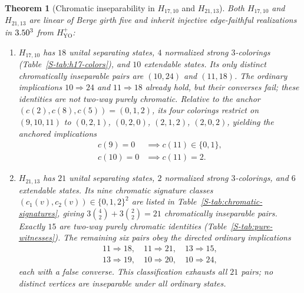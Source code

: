 \documentclass[aps,pra,reprint,superscriptaddress,longbibliography,nofootinbib,floatfix,10pt]{revtex4-2}
\newtheorem{theorem}{Theorem}
\theoremstyle{definition}\newtheorem{definition}[theorem]{Definition}
\theoremstyle{remark}\newtheorem{remark}[theorem]{Remark}
\newcommand{\YO}{\mathrm{YO}}\newcommand{\ip}[2]{\langle #1,#2\rangle}
\begin{document}
\begin{theorem}[Chromatic inseparability in $H_{17,10}$ and $H_{21,13}$]\label{thm:h17}\label{thm:h21}
Both $H_{17,10}$ and $H_{21,13}$ are linear of Berge girth five and inherit injective edge-faithful realizations in $3.50^3$ from $H_{\YO}^{+}$:
\begin{enumerate}
\item $H_{17,10}$ has $18$ unital separating states, $4$ normalized strong $3$-colorings (Table~\ref{S-tab:h17-colors}), and $10$ extendable states. Its only distinct chromatically inseparable pairs are $(10,24)$ and $(11,18)$. The ordinary implications $10\Rightarrow24$ and $11\Rightarrow18$ already hold, but their converses fail; these identities are not two-way purely chromatic. Relative to the anchor $(c(2),c(8),c(5))=(0,1,2)$, its four colorings restrict on $(9,10,11)$ to $(0,2,1)$, $(0,2,0)$, $(2,1,2)$, $(2,0,2)$, yielding the anchored implications
\begin{equation}\label{eq:anchored}
\begin{aligned}
c(9)=0&\implies c(11)\in\{0,1\},\\
c(10)=0&\implies c(11)=2.
\end{aligned}
\end{equation}
\item $H_{21,13}$ has $21$ unital separating states, $2$ normalized strong $3$-colorings, and $6$ extendable states. Its nine chromatic signature classes $(c_1(v),c_2(v))\in\{0,1,2\}^2$ are listed in Table~\ref{S-tab:chromatic-signatures}, giving $3\binom{4}{2}+3\binom{2}{2}=21$ chromatically inseparable pairs. Exactly $15$ are two-way purely chromatic identities (Table~\ref{S-tab:pure-witnesses}). The remaining six pairs obey the directed ordinary implications
\[
\begin{gathered}
11\Rightarrow18,\quad11\Rightarrow21,\quad
13\Rightarrow15,\\
13\Rightarrow19,\quad10\Rightarrow20,\quad
10\Rightarrow24,
\end{gathered}
\]
each with a false converse. This classification exhausts all $21$ pairs; no distinct vertices are inseparable under all ordinary states.
\end{enumerate}
\end{theorem}
\end{document}
